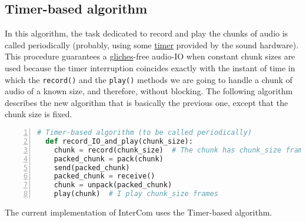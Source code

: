 \subsection{Timer-based algorithm}

In this algorithm, the task dedicated to record and play the chunks of
audio is called periodically (probably, using some
\href{https://en.wikipedia.org/wiki/Timer}{timer} provided by the
sound hardware). This procedure guarantees a
\href{https://en.wikipedia.org/wiki/Glitch}{gliches}-free audio-IO
when constant chunk sizes are used because the timer interruption
coincides exactly with the instant of time in which the
\verb|record()| and the \verb|play()| methods we are going to handle a
chunk of audio of a known size, and therefore, without blocking. The following
algorithm describes the new algorithm that is basically the previous
one, except that the chunk size is fixed.

\begin{lstlisting}[language=Python,numbers=left]
  # Timer-based algorithm (to be called periodically)
  def record_IO_and_play(chunk_size):
    chunk = record(chunk_size)  # The chunk has chunk_size frames
    packed_chunk = pack(chunk)
    send(packed_chunk)
    packed_chunk = receive()
    chunk = unpack(packed_chunk)
    play(chunk)  # I play chunk_size frames
\end{lstlisting}


The current implementation of InterCom uses the Timer-based algorithm.

